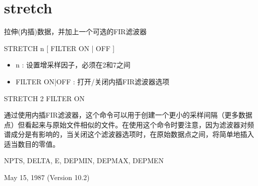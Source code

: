 \section{stretch}
\label{cmd:stretch}

拉伸(内插)数据，并加上一个可选的FIR滤波器

STRETCH  n [ FILTER ON | OFF ]

\begin{itemize}
\item n : 设置增采样因子，必须在2和7之间 
\item FILTER ON|OFF : 打开/关闭内插FIR滤波器选项 
\end{itemize}

STRETCH 2 FILTER ON

通过使用内插FIR滤波器，这个命令可以用于创建一个更小的采样间隔（更多数据点）但看起来与原始文件相似的文件。在使用这个命令时要注意，因为滤波器对频谱成分是有影响的，当关闭这个滤波器选项时，在原始数据点之间，将简单地插入适当数目的零值。

NPTS, DELTA, E, DEPMIN, DEPMAX, DEPMEN

May 15, 1987 (Version 10.2)

